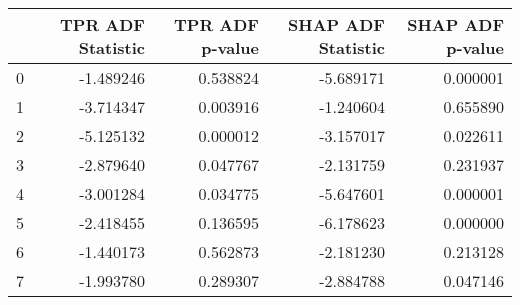\begin{tabular}{lrrrr}
\toprule
 & TPR ADF Statistic & TPR ADF p-value & SHAP ADF Statistic & SHAP ADF p-value \\
\midrule
0 & -1.489246 & 0.538824 & -5.689171 & 0.000001 \\
1 & -3.714347 & 0.003916 & -1.240604 & 0.655890 \\
2 & -5.125132 & 0.000012 & -3.157017 & 0.022611 \\
3 & -2.879640 & 0.047767 & -2.131759 & 0.231937 \\
4 & -3.001284 & 0.034775 & -5.647601 & 0.000001 \\
5 & -2.418455 & 0.136595 & -6.178623 & 0.000000 \\
6 & -1.440173 & 0.562873 & -2.181230 & 0.213128 \\
7 & -1.993780 & 0.289307 & -2.884788 & 0.047146 \\
\bottomrule
\end{tabular}
